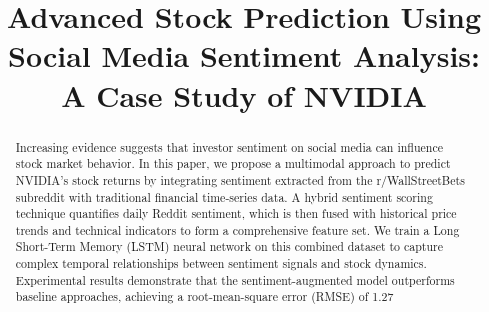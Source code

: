 \documentclass[conference]{IEEEtran}
\begin{document}
\title{Advanced Stock Prediction Using Social Media Sentiment Analysis: A Case Study of NVIDIA}

\author{
	\and
}

\maketitle

\begin{abstract}
	Increasing evidence suggests that investor sentiment on social media can influence stock market behavior. In this paper, we propose a multimodal approach to predict NVIDIA's stock returns by integrating sentiment extracted from the r/WallStreetBets subreddit with traditional financial time-series data. A hybrid sentiment scoring technique quantifies daily Reddit sentiment, which is then fused with historical price trends and technical indicators to form a comprehensive feature set. We train a Long Short-Term Memory (LSTM) neural network on this combined dataset to capture complex temporal relationships between sentiment signals and stock dynamics. Experimental results demonstrate that the sentiment-augmented model outperforms baseline approaches, achieving a root-mean-square error (RMSE) of 1.27%
\end{abstract}
\end{document}

